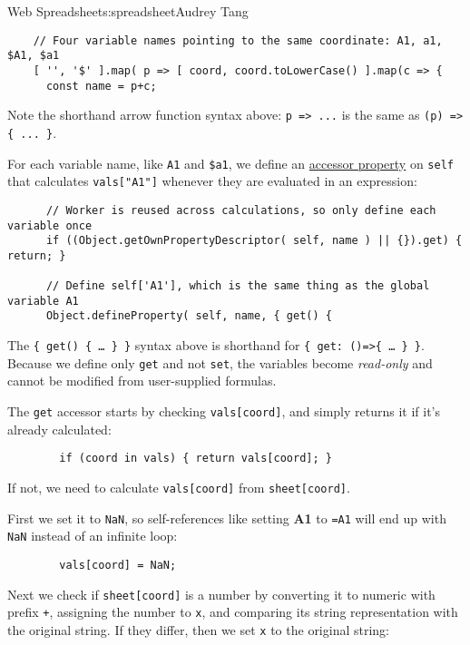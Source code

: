 \begin{aosachapter}{Web Spreadsheet}{s:spreadsheet}{Audrey Tang}
\begin{verbatim}
    // Four variable names pointing to the same coordinate: A1, a1, $A1, $a1
    [ '', '$' ].map( p => [ coord, coord.toLowerCase() ].map(c => {
      const name = p+c;
\end{verbatim}

Note the shorthand arrow function syntax above:
\texttt{p =\textgreater{} ...} is the same as
\texttt{(p) =\textgreater{} \{ ... \}}.

For each variable name, like \texttt{A1} and \texttt{\$a1}, we define an
\href{https://developer.mozilla.org/en-US/docs/Web/JavaScript/Reference/Global_Objects/Object/defineProperty}{accessor
property} on \texttt{self} that calculates \texttt{vals{[}"A1"{]}}
whenever they are evaluated in an expression:

\begin{verbatim}
      // Worker is reused across calculations, so only define each variable once
      if ((Object.getOwnPropertyDescriptor( self, name ) || {}).get) { return; }

      // Define self['A1'], which is the same thing as the global variable A1
      Object.defineProperty( self, name, { get() {
\end{verbatim}

The \texttt{\{ get() \{ \ldots{} \} \}} syntax above is shorthand for
\texttt{\{ get: ()=\textgreater{}\{ \ldots{} \} \}}. Because we define
only \texttt{get} and not \texttt{set}, the variables become
\emph{read-only} and cannot be modified from user-supplied formulas.

The \texttt{get} accessor starts by checking \texttt{vals{[}coord{]}},
and simply returns it if it's already calculated:

\begin{verbatim}
        if (coord in vals) { return vals[coord]; }
\end{verbatim}

If not, we need to calculate \texttt{vals{[}coord{]}} from
\texttt{sheet{[}coord{]}}.

First we set it to \texttt{NaN}, so self-references like setting
\textbf{A1} to \texttt{=A1} will end up with \texttt{NaN} instead of an
infinite loop:

\begin{verbatim}
        vals[coord] = NaN;
\end{verbatim}

Next we check if \texttt{sheet{[}coord{]}} is a number by converting it
to numeric with prefix \texttt{+}, assigning the number to \texttt{x},
and comparing its string representation with the original string. If
they differ, then we set \texttt{x} to the original string:


\end{aosachapter}
